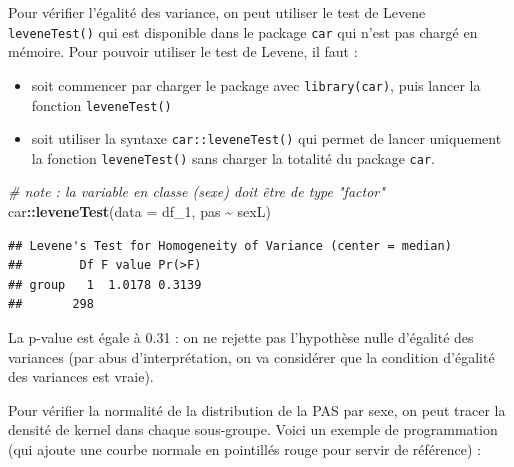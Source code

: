 \documentclass[
]{book}
\newenvironment{Shaded}{\begin{snugshade}}{\end{snugshade}}
\newcommand{\AttributeTok}[1]{\textcolor[rgb]{0.13,0.29,0.53}{#1}}
\newcommand{\CommentTok}[1]{\textcolor[rgb]{0.56,0.35,0.01}{\textit{#1}}}
\newcommand{\FunctionTok}[1]{\textcolor[rgb]{0.13,0.29,0.53}{\textbf{#1}}}
\newcommand{\NormalTok}[1]{#1}
\newcommand{\SpecialCharTok}[1]{\textcolor[rgb]{0.81,0.36,0.00}{\textbf{#1}}}
\providecommand{\tightlist}{%
  \setlength{\itemsep}{0pt}\setlength{\parskip}{0pt}}
\begin{document}
Pour vérifier l'égalité des variance, on peut utiliser le test de Levene \texttt{leveneTest()} qui est disponible dans le package \texttt{car} qui n'est pas chargé en mémoire. Pour pouvoir utiliser le test de Levene, il faut :

\begin{itemize}
\tightlist
\item
  soit commencer par charger le package avec \texttt{library(car)}, puis lancer la fonction \texttt{leveneTest()}
\item
  soit utiliser la syntaxe \texttt{car::leveneTest()} qui permet de lancer uniquement la fonction \texttt{leveneTest()} sans charger la totalité du package \texttt{car}.
\end{itemize}

\begin{Shaded}
\begin{Highlighting}[]
\CommentTok{\# note : la variable en classe (sexe) doit être de type "factor"}
\NormalTok{car}\SpecialCharTok{::}\FunctionTok{leveneTest}\NormalTok{(}\AttributeTok{data =}\NormalTok{ df\_1, pas }\SpecialCharTok{\textasciitilde{}}\NormalTok{ sexL) }
\end{Highlighting}
\end{Shaded}

\begin{verbatim}
## Levene's Test for Homogeneity of Variance (center = median)
##        Df F value Pr(>F)
## group   1  1.0178 0.3139
##       298
\end{verbatim}

La p-value est égale à 0.31 : on ne rejette pas l'hypothèse nulle d'égalité des variances (par abus d'interprétation, on va considérer que la condition d'égalité des variances est vraie).

Pour vérifier la normalité de la distribution de la PAS par sexe, on peut tracer la densité de kernel dans chaque sous-groupe. Voici un exemple de programmation (qui ajoute une courbe normale en pointillés rouge pour servir de référence) :
\end{document}
